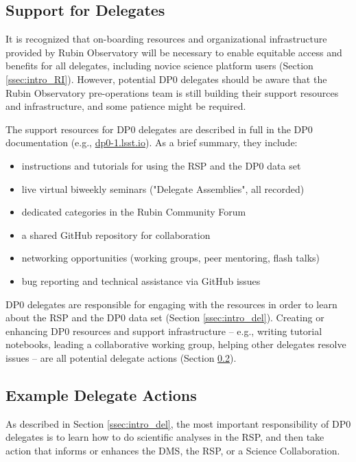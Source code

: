 \documentclass[DM,lsstdraft,authoryear,toc]{lsstdoc}
\begin{document}
\subsection{Support for Delegates}\label{ssec:res_sup}

It is recognized that on-boarding resources and organizational infrastructure provided by Rubin Observatory will be necessary to enable equitable access and benefits for all delegates, including novice science platform users (Section \ref{ssec:intro_RI}). 
However, potential DP0 delegates should be aware that the Rubin Observatory pre-operations team is still building their support resources and infrastructure, and some patience might be required. 

The support resources for DP0 delegates are described in full in the DP0 documentation (e.g., \url{dp0-1.lsst.io}). As a brief summary, they include:
\begin{itemize}
\item instructions and tutorials for using the RSP and the DP0 data set
\item live virtual biweekly seminars ("Delegate Assemblies", all recorded)
\item dedicated categories in the Rubin Community Forum
\item a shared GitHub repository for collaboration
\item networking opportunities (working groups, peer mentoring, flash talks)
\item bug reporting and technical assistance via GitHub issues
\end{itemize}

DP0 delegates are responsible for engaging with the resources in order to learn about the RSP and the DP0 data set (Section \ref{ssec:intro_del}).
Creating or enhancing DP0 resources and support infrastructure -- e.g., writing tutorial notebooks, leading a collaborative working group, helping other delegates resolve issues -- are all potential delegate actions (Section \ref{ssec:res_act}).


\subsection{Example Delegate Actions}\label{ssec:res_act}

As described in Section \ref{ssec:intro_del}, the most important responsibility of DP0 delegates is to learn how to do scientific analyses in the RSP, and then take action that informs or enhances the DMS, the RSP, or a Science Collaboration. 
\end{document}
